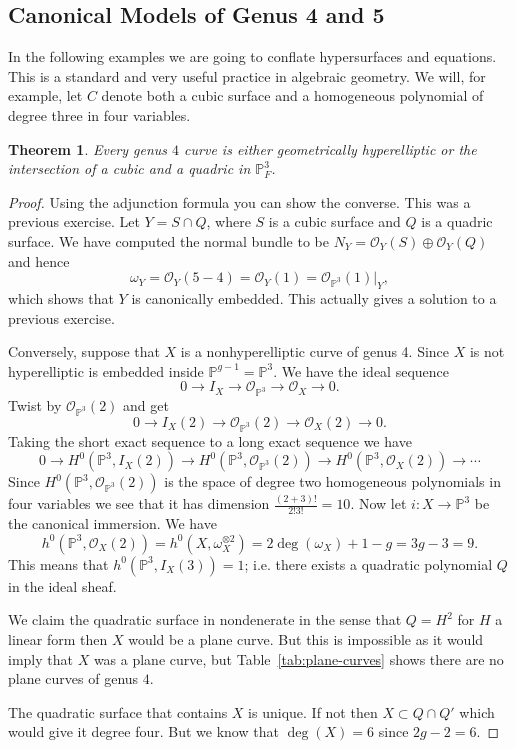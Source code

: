 \documentclass[12pt]{article}
\numberwithin{equation}{section}
\newtheorem{theorem}{Theorem}[subsection]
\theoremstyle{definition}
\theoremstyle{remark}
\newcommand{\Ocal}{\mathcal{O}}
\newcommand{\PP}{\mathbb{P}}
\begin{document}
\subsection{Canonical Models of Genus 4 and 5}
In the following examples we are going to conflate hypersurfaces and equations. 
This is a standard and very useful practice in algebraic geometry. 
We will, for example, let $C$ denote both a cubic surface and a homogeneous polynomial of degree three in four variables.
\begin{theorem}
	Every genus $4$ curve is either geometrically hyperelliptic or the intersection of a cubic and a quadric in $\PP^3_F$. 
\end{theorem}
\begin{proof}
	Using the adjunction formula you can show the converse. 
	This was a previous exercise. 
	Let $Y = S\cap Q$, where $S$ is a cubic surface and $Q$ is a quadric surface. 
	We have computed the normal bundle to be 
	$N_{Y} = \Ocal_Y(S)\oplus \Ocal_Y(Q)$ and hence
	 $$ \omega_Y = \Ocal_Y(5-4)=\Ocal_Y(1) = \Ocal_{\PP^3}(1)\vert_Y,$$
	which shows that $Y$ is canonically embedded. 
	This actually gives a solution to a previous exercise. 
	
	Conversely, suppose that $X$ is a nonhyperelliptic curve of genus 4. 
	Since $X$ is not hyperelliptic is embedded inside $\PP^{g-1} = \PP^3$. 
	We have the ideal sequence 
	 $$ 0 \to I_X\to \Ocal_{\PP^3} \to \Ocal_X \to 0.$$
	Twist by $\Ocal_{\PP^3}(2)$ and get 
	 $$0 \to I_X(2) \to \Ocal_{\PP^3}(2) \to \Ocal_X(2) \to 0. $$
	Taking the short exact sequence to a long exact sequence we have 
	 $$ 0 \to H^0(\PP^3,I_X(2)) \to H^0(\PP^3,\Ocal_{\PP^3}(2)) \to H^0(\PP^3,\Ocal_X(2)) \to \cdots $$
	 Since $H^0(\PP^3,\Ocal_{\PP^3}(2))$ is the space of degree two homogeneous polynomials in four variables we see that it has dimension $\frac{(2+3)!}{2!3!}=10$.
	 Now let $i:X\to \PP^3$ be the canonical immersion. 
	 We have 
	 $$h^0(\PP^3,\Ocal_X(2)) = h^0(X,\omega_X^{\otimes 2}) = 2 \deg(\omega_X) + 1-g = 3g-3 = 9.$$
	 This means that $h^0(\PP^3,I_X(3))=1$; i.e. there exists a quadratic polynomial $Q$ in the ideal sheaf.
	 
	 We claim the quadratic surface in nondenerate in the sense that $Q=H^2$ for $H$ a linear form then $X$ would be a plane curve. 
	 But this is impossible as it would imply that $X$ was a plane curve, but Table~\ref{tab:plane-curves} shows there are no plane curves of genus $4$.
	 
	 The quadratic surface that contains $X$ is unique. 
	 If not then $X \subset Q\cap Q'$ which would give it degree four.
	 But we know that $\deg(X)=6$ since $2g-2=6$.
	 

\end{proof}
\end{document}
